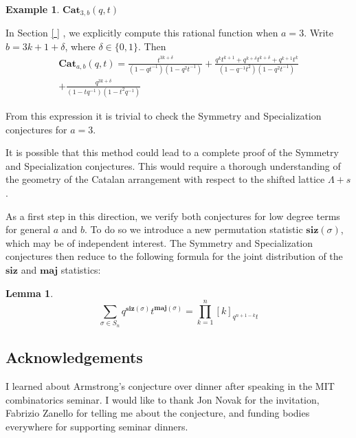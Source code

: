 \documentclass{amsart}[12pt]
\theoremstyle{definition}
\newtheorem{lemma}[dummy]{Lemma}
\newtheorem{example}[dummy]{Example}
\newcommand{\Cat}{\mathbf{Cat}}
\newcommand{\maj}{\mathbf{maj}}
\newcommand{\siz}{\mathbf{siz}}
\begin{document}
\begin{example}{$\Cat_{3,b}(q,t)$}

In Section \ref{ } , we explicitly compute this rational function when $a=3$.  Write $b=3k+1+\delta$, where $\delta\in\{0,1\}$.  Then
\begin{multline*}
\Cat_{a,b}(q,t)=\frac{t^{3k+\delta}}{(1-qt^{-1})(1-q^2t^{-1})} +\frac{q^kt^{k+1}+q^{k+\delta}t^{k+\delta}+q^{k+1}t^k}{(1-q^{-1}t^2)(1-q^2t^{-1})} \\+\frac{q^{3k+\delta}}{(1-tq^{-1})(1-t^2q^{-1})}
\end{multline*}

From this expression it is trivial to check the Symmetry and Specialization conjectures for $a=3$.
\end{example}

It is possible that this method could lead to a complete proof of the Symmetry and Specialization conjectures.  This would require a thorough understanding of the geometry of the Catalan arrangement with respect to the shifted lattice $\Lambda+s$.

 As a first step in this direction, we verify both conjectures for low degree terms for general $a$ and $b$.  To do so we introduce a new permutation statistic $\siz(\sigma)$, which may be of independent interest.  The Symmetry and Specialization conjectures then reduce to the following formula for the joint distribution of the $\siz$ and $\maj$ statistics:
\begin{lemma}
$$\sum_{\sigma\in S_n} q^{\siz(\sigma)}t^{\maj(\sigma)}=\prod_{k=1}^n [k]_{q^{n+1-k}t}$$ 
\end{lemma}


\subsection{Acknowledgements}
I learned about Armstrong's conjecture over dinner after speaking in the MIT combinatorics seminar.  I would like to thank Jon Novak for the invitation, Fabrizio Zanello for telling me about the conjecture, and funding bodies everywhere for supporting seminar dinners.





\end{document}
